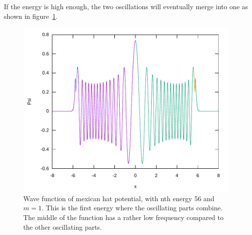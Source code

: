 \documentclass[11pt,DIV=10,final]{scrreprt} %
\begin{document}
\begin{minipage}{\textwidth}
If the energy is high enough, the two oscillations will eventually merge into one as shown in figure~\ref{fig:mexican-hat-56th-energy}.
\begin{figure}[H]
  \centering
  \includegraphics[width=\textwidth]{plots/mexican-hat-56.pdf}
  \caption{
    Wave function of mexican hat potential, with nth energy 56 and $m = 1$. This is the first energy where the oscillating parts combine. The middle of the function has a rather low frequency compared
    to the other oscillating parts.
  }\label{fig:mexican-hat-56th-energy}
\end{figure}
\end{minipage}
\end{document}
